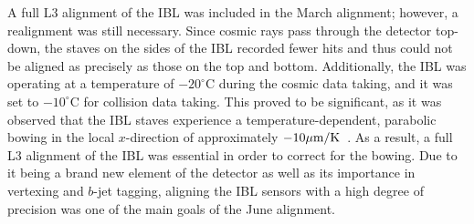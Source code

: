 A full L3 alignment of the IBL was included in the March alignment; however, a realignment was still necessary.
Since cosmic rays pass through the detector top-down, the staves on the sides of the IBL recorded fewer hits and thus could not be aligned as precisely as those on the top and bottom.
Additionally, the IBL was operating at a temperature of $-20^{\circ}\textrm{C}$ during the cosmic data taking, and it was set to $-10^{\circ}\textrm{C}$ for collision data taking.
This proved to be significant, as it was observed that the IBL staves experience a temperature-dependent, parabolic bowing in the local $x$-direction of approximately $-10\mu\textrm{m}/\textrm{K}$~\cite{2015.alignment-ibl-stability}.
As a result, a full L3 alignment of the IBL was essential in order to correct for the bowing.
Due to it being a brand new element of the detector as well as its importance in vertexing and $b$-jet tagging, aligning the IBL sensors with a high degree of precision was one of the main goals of the June alignment.

